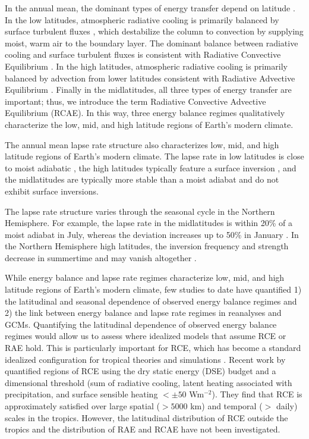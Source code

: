 \documentclass{ametsocV5}
\begin{document}
In the annual mean, the dominant types of energy transfer depend on latitude \citep[e.g., see Fig.~6.1 in][]{hartmann2016}. In the low latitudes, atmospheric radiative cooling is primarily balanced by surface turbulent fluxes \citep{riehl1958}, which destabilize the column to convection by supplying moist, warm air to the boundary layer. The dominant balance between radiative cooling and surface turbulent fluxes is consistent with Radiative Convective Equilibrium \citep[RCE,][]{wing2018}. In the high latitudes, atmospheric radiative cooling is primarily balanced by advection from lower latitudes \citep{nakamura1988} consistent with Radiative Advective Equilibrium \citep[RAE,][]{cronin2016}. Finally in the midlatitudes, all three types of energy transfer are important; thus, we introduce the term Radiative Convective Advective Equilibrium (RCAE). In this way, three energy balance regimes qualitatively characterize the low, mid, and high latitude regions of Earth's modern climate.

The annual mean lapse rate structure also characterizes low, mid, and high latitude regions of Earth's modern climate. The lapse rate in low latitudes is close to moist adiabatic \citep{stone1979,betts1982,xu1989,williams1993}, the high latitudes typically feature a surface inversion \citep[e.g., see Fig.~1.3 in][]{hartmann2016}, and the midlatitudes are typically more stable than a moist adiabat \citep{stone1979,korty2007} and do not exhibit surface inversions.

The lapse rate structure varies through the seasonal cycle in the Northern Hemisphere. For example, the lapse rate in the midlatitudes is within 20\% of a moist adiabat in July, whereas the deviation increases up to 50\% in January \citep{stone1979}. In the Northern Hemisphere high latitudes, the inversion frequency and strength decrease in summertime \citep{bradley1992, tjernstrom2009, devasthale2010, zhang2011, cronin2016} and may vanish altogether \citep{stone1979}.

While energy balance and lapse rate regimes characterize low, mid, and high latitude regions of Earth's modern climate, few studies to date have quantified 1) the latitudinal and seasonal dependence of observed energy balance regimes and 2) the link between energy balance and lapse rate regimes in reanalyses and GCMs. Quantifying the latitudinal dependence of observed energy balance regimes would allow us to assess where idealized models that assume RCE or RAE hold. This is particularly important for RCE, which has become a standard idealized configuration for tropical theories \citep[e.g.,][]{emanuel1996,nilsson1999,romps2014,singh2015} and simulations \citep[][and the references therein]{wing2018}. Recent work by \cite{jakob2019} quantified regions of RCE using the dry static energy (DSE) budget and a dimensional threshold (sum of radiative cooling, latent heating associated with precipitation, and surface sensible heating $< \pm 50$ Wm$^{-2}$). They find that RCE is approximately satisfied over large spatial ($>5000$ km) and temporal ($>$ daily) scales in the tropics. However, the latitudinal distribution of RCE outside the tropics and the distribution of RAE and RCAE have not been investigated.
\end{document}
